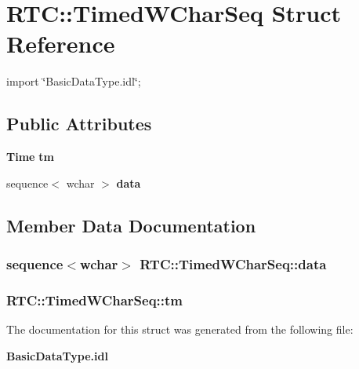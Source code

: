 \section{RTC::TimedWCharSeq Struct Reference}
\label{structRTC_1_1TimedWCharSeq}


{\ttfamily import \char`\"{}BasicDataType.idl\char`\"{};}

\subsection*{Public Attributes}
\begin{DoxyCompactItemize}
\item 
{\bf Time} {\bf tm}
\item 
sequence$<$ wchar $>$ {\bf data}
\end{DoxyCompactItemize}


\subsection{Member Data Documentation}
\subsubsection[{data}]{\setlength{\rightskip}{0pt plus 5cm}sequence$<$wchar$>$ {\bf RTC::TimedWCharSeq::data}}\label{structRTC_1_1TimedWCharSeq_a23d1cbf89923a07f543f8a69ccaad3a1}
\subsubsection[{tm}]{ {\bf RTC::TimedWCharSeq::tm}}\label{structRTC_1_1TimedWCharSeq_a408c0da590498352074ee15299200f2c}


The documentation for this struct was generated from the following file:\begin{DoxyCompactItemize}
\item 
{\bf BasicDataType.idl}\end{DoxyCompactItemize}
